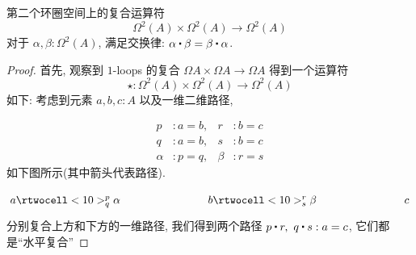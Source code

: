 \begin{thm}\label{thm:EckmannHilton}
第二个环圈空间上的复合运算符
%
\begin{equation*}
\Omega^2(A)\times \Omega^2(A)\to \Omega^2(A)
\end{equation*}
对于 $\alpha, \beta:\Omega^2(A)$, 满足交换律: $\alpha\ct\beta = \beta\ct\alpha$.
%
\end{thm}

\begin{proof}
首先, 观察到 $1$-loops 的复合 $\Omega A\times \Omega A\to \Omega A$ 得到一个运算符 \[
\star : \Omega^2(A)\times \Omega^2(A)\to \Omega^2(A)
\]
如下: 考虑到元素 $a, b, c : A$ 以及一维二维路径, %

\begin{align*}
p &: a = b, &r &: b = c \\
q &: a = b, &s &: b = c \\
\alpha &: p = q, &\beta &: r = s
\end{align*}
%
如下图所示(其中箭头代表路径). %

\[
\xymatrix@+5em{
{a} \rtwocell<10>^p_q{\alpha}
&
{b} \rtwocell<10>^r_s{\beta}
&
{c}
}
\]
分别复合上方和下方的一维路径, 我们得到两个路径 $p\ct r,\ q\ct s : a = c$, 它们都是``水平复合'' %


\end{proof}
